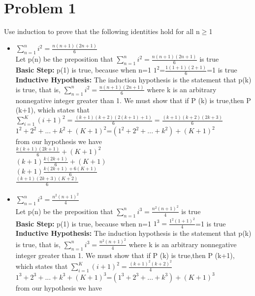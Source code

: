 \documentclass[12pt,letterpaper]{article}
\begin{document}
\section*{Problem 1}
Use induction to prove that the following identities hold for all n\(\geq\)1
\begin{itemize}
      \item \(\sum_{n=1}^{n} i^2=\frac{n(n+1)(2n+1)}{6}\)\\
      Let p(n)  be the preposition that \(\sum_{n=1}^{n} i^2=\frac{n(n+1)(2n+1)}{6}\) is true\\ 
      \textbf{Basic Step:} p(1) is true, because when n=1 \(1^2\)=\(\frac{1(1+1)(2+1)}{6}\)=1 is true\\
      \textbf{Inductive Hypothesis:} The induction hypothesis is the statement
      that p(k) is true, that is, \(\sum_{n=1}^{n} i^2=\frac{n(n+1)(2n+1)}{6}\) where k is an arbitrary nonnegative integer
      greater than 1. We must show that if P (k) is true,then P (k+1), which states that
      \(\sum_{i=1}^{K} (i+1)^2=\frac{(k+1)(k+2)(2(k+1)+1)}{6}=\frac{(k+1)(k+2)(2k+3)}{6}\)\\
      \(1^2+2^2+...+k^2+(K+1)^2 \)=\((1^2+2^2+...+k^2)+(K+1)^2 \)\\
      from our hypothesis we have \\
      \(\frac{k(k+1)(2k+1)}{6}+(K+1)^2\)\\
      \((k+1)\frac{k(2k+1)}{6}+(K+1)\)\\
      \((k+1)\frac{k(2k+1)+6(K+1)}{6}\)\\
      \(\frac{(k+1)(2k+3)(K+2)}{6}\)
      \item \(\sum_{n=1}^{n} i^3=\frac{n^2(n+1)^2}{4}\)\\
      Let p(n)  be the preposition that \(\sum_{n=1}^{n} i^3=\frac{n^2(n+1)^2}{4}\) is true\\
      \textbf{Basic Step:} p(1) is true, because when n=1 \(1^3=\frac{1^2(1+1)^2}{4}\)=1 is true\\
      \textbf{Inductive Hypothesis:} The induction hypothesis is the statement
      that p(k) is true, that is, \(\sum_{n=1}^{n} i^3=\frac{n^2(n+1)^2}{4}\) where k is an arbitrary nonnegative integer
      greater than 1. We must show that if P (k) is true,then P (k+1), which states that
      \(\sum_{i=1}^{K} (i+1)^2=\frac{(k+1)^2(k+2)^2}{4}\)\\
      \(1^3+2^3+...+k^3+(K+1)^3 \)=\((1^3+2^3+...+k^3)+(K+1)^3 \)\\
      from our hypothesis we have \\

\end{itemize}
\end{document}
